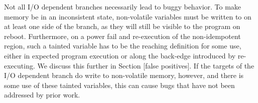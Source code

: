  Not all I/O dependent branches necessarily lead to buggy behavior. To make memory be in an inconsistent state, non-volatile variables must be written to on at least one side of the branch, as they will still be visible to the program on reboot. Furthermore, on a power fail and re-execution of the non-idempotent region, such a tainted variable has to be the reaching definition for some use, either in expected program execution or along the back-edge introduced by re-executing. We discuss this further in Section [false positives]. If the targets of the I/O dependent branch do write to non-volatile memory, however, and there is some use of these tainted variables, this can cause bugs that have not been addressed by prior work.

	


